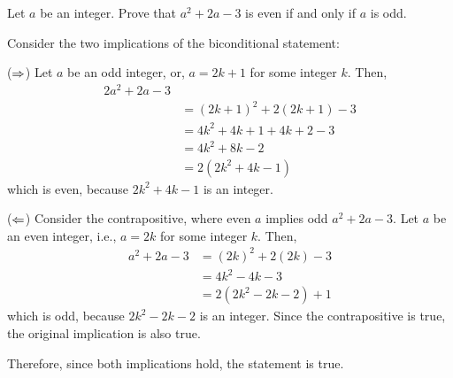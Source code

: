\begin{recommended}
  Let $a$ be an integer. Prove that $a^2 + 2a - 3$ is even if and only if $a$ is odd.
\end{recommended}
\begin{prf}
  Consider the two implications of the biconditional statement:

  ($\Rightarrow$) Let $a$ be an odd integer, or, $a = 2k+1$ for some integer $k$. Then,
  \begin{align*}{2}
    a^2 + 2a - 3                    \\
     & = (2k + 1)^2 + 2(2k + 1) - 3 \\
     & = 4k^2 + 4k + 1 + 4k + 2 - 3 \\
     & = 4k^2 + 8k - 2              \\
     & = 2(2k^2 + 4k - 1)
  \end{align*}
  which is even, because $2k^2+4k-1$ is an integer.

  ($\Leftarrow$) Consider the contrapositive, where even $a$ implies odd $a^2 + 2a - 3$.
  Let $a$ be an even integer, i.e., $a = 2k$ for some integer $k$. Then,
  \begin{align*}
    a^2 + 2a - 3
     & = (2k)^2 + 2(2k) - 3   \\
     & = 4k^2 - 4k - 3        \\
     & = 2(2k^2 - 2k - 2) + 1
  \end{align*}
  which is odd, because $2k^2 - 2k - 2$ is an integer.
  Since the contrapositive is true, the original implication is also true.

  Therefore, since both implications hold, the statement is true.
\end{prf}


